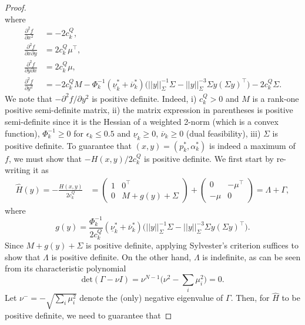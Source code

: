 \documentclass{article}
\begin{document}
\begin{proof}
\begin{equation*}
\end{equation*}
where
\begin{align*}
\frac{\partial^2 f}{\partial x^2} &= - 2c_k^Q,\\
\frac{\partial^2 f}{\partial x \partial y} &= 2 c_k^Q \mu^\top,\\
\frac{\partial^2 f}{\partial y \partial x} &= 2 c_k^Q \mu,\\
\frac{\partial^2 f}{\partial y^2} &= -2 c_k^Q M - \Phi_k^{-1}(\underline{\nu}_k^* + \overline{\nu}_k^*)\Big(||y||_\Sigma^{-1} \Sigma - ||y||_\Sigma^{-3} \Sigma y(\Sigma y)^\top\Big) - 2c_k^Q \Sigma.
\end{align*}
We note that $-\partial^2 f/\partial y^2$ is positive definite. Indeed, i) $c_k^Q > 0$ and $M$ is a rank-one positive semi-definite matrix, ii) the matrix expression in parentheses is positive semi-definite since it is the Hessian of a weighted 2-norm (which is a convex function), $\Phi_k^{-1} \ge 0$ for $\epsilon_k \le 0.5$ and $\underline{\nu}_k \ge 0$, $\overline{\nu}_k \ge 0$ (dual feasibility), iii) $\Sigma$ is positive definite. To guarantee that $(x, y) = (p_k^*, \alpha_k^*)$ is indeed a maximum of $f$, we must show that $-H(x, y)/2c_k^Q$ is positive definite. We first start by re-writing it as
\begin{align*}
\hat{H}(y) = -\frac{H(x, y)}{2c_k^Q} &= \begin{pmatrix} 1 & 0^\top \\ 0 & M + g(y) + \Sigma\end{pmatrix} + \begin{pmatrix} 0 & -\mu^\top \\ -\mu & 0\end{pmatrix} = \Lambda + \Gamma,
\end{align*} 
where
\begin{equation*}
g(y) = \frac{\Phi_k^{-1}}{2 c_k^Q}(\underline{\nu}_k^* + \overline{\nu}_k^*)\Big(||y||_\Sigma^{-1} \Sigma - ||y||_\Sigma^{-3} \Sigma y(\Sigma y)^\top\Big).
\end{equation*}
Since $M + g(y) + \Sigma$ is positive definite, applying Sylvester's criterion suffices to show that $\Lambda$ is positive definite. On the other hand, $\Lambda$ is indefinite, as can be seen from its characteristic polynomial
\begin{equation*}
\mbox{det}(\Gamma - \nu I) = \nu^{N-1}\Big(\nu^2 - \sum_{i} \mu_i^2 \Big) = 0.
\end{equation*}
Let $\nu^- = -\sqrt{\sum_{i} \mu_i^2}$ denote the (only) negative eigenvalue of $\Gamma$. Then, for $\hat{H}$ to be positive definite, we need to guarantee that

\end{proof}
\end{document}
